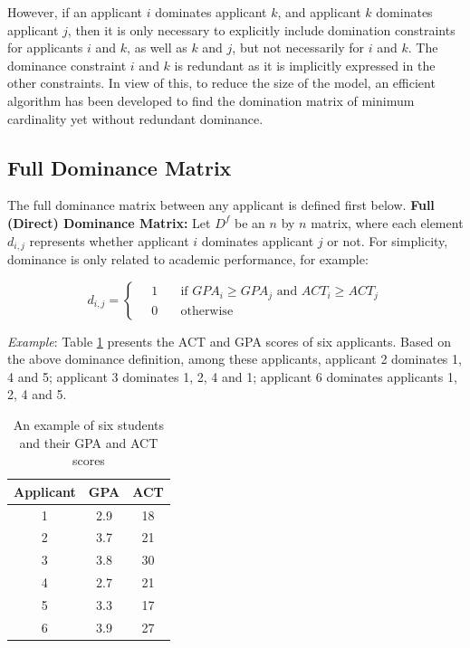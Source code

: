 \documentclass[12pt,english]{report}
\begin{document}
However, if an applicant $i$ dominates applicant $k$, and applicant $k$ dominates applicant $j$, then it is only necessary to explicitly include domination constraints for applicants $i$ and $k$, as well as $k$ and $j$, but not necessarily for $i$ and $k$. The dominance constraint $i$ and $k$ is redundant as it is implicitly expressed in the other constraints.  In view of this, to reduce the size of the model, an efficient algorithm has been developed to find the domination matrix of minimum cardinality yet without redundant dominance.

\subsection{Full Dominance Matrix}
The full dominance matrix between any applicant is defined first below. \textbf{Full (Direct) Dominance Matrix:} Let $D^{f}$ be an $n$ by $n$ matrix, where each element $d_{i,j}$ represents whether applicant $i$ dominates applicant $j$ or not. For simplicity,  dominance is only related to academic performance, for example:

\begin{equation}
   d_{i,j} =
  \begin{cases}
\quad   1   & \quad \mbox{if }  GPA_i \geq GPA_j \mbox{ and }  ACT_i \geq ACT_j
\\
  \quad   0  & \quad \mbox{otherwise}
  \end{cases}   
\end{equation}

\vspace{0.15in}
\noindent \textit{Example}:  Table \ref{student_sample} presents the ACT and GPA scores of six applicants.  Based on the above dominance definition, among these applicants, applicant 2 dominates 1, 4 and 5; applicant 3 dominates 1, 2, 4 and 1; applicant 6 dominates applicants 1, 2, 4 and 5.


\begin{table}[H]
\centering
\begin{tabular}{|c|c|c|}
\hline
  Applicant & GPA & ACT \\ [0.5ex] 
\hline
1 & 2.9 & 18 \\ \hline
2 & 3.7 & 21 \\ \hline
3 & 3.8 & 30 \\ \hline
4 & 2.7 & 21 \\ \hline
5 & 3.3 & 17 \\ \hline
6 & 3.9 & 27 \\ \hline
\end{tabular}
\caption{An example of six students and their GPA and ACT scores} 
\label{student_sample}
\end{table}
\end{document}
